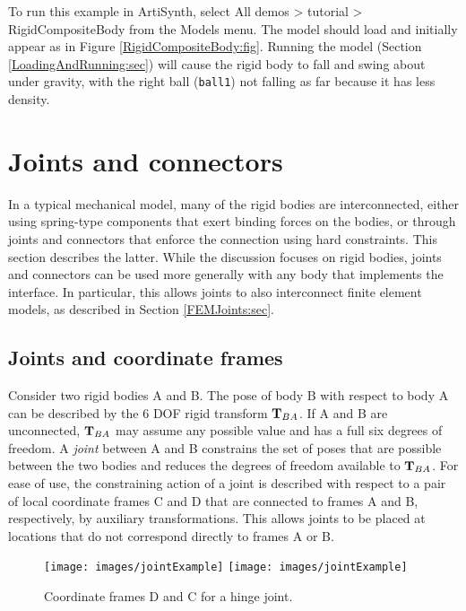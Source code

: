 To run this example in ArtiSynth, select {\sf All demos > tutorial >
RigidCompositeBody} from the {\sf Models} menu. The model should load
and initially appear as in Figure \ref{RigidCompositeBody:fig}.
Running the model (Section \ref{LoadingAndRunning:sec}) will cause the
rigid body to fall and swing about under gravity, with the right ball
({\tt ball1}) not falling as far because it has less density.

\section{Joints and connectors}
\label{JointsAndConnectors:sec}

In a typical mechanical model, many of the rigid bodies are
interconnected, either using spring-type components that exert binding
forces on the bodies, or through joints and connectors that enforce
the connection using hard constraints. This section describes the
latter. While the discussion focuses on rigid bodies, joints and
connectors can be used more generally with any body that implements
the 
interface. In particular, this allows joints to also interconnect
finite element models, as described in Section \ref{FEMJoints:sec}.

\subsection{Joints and coordinate frames}
\label{JointsAndFrames:sec}

Consider two rigid bodies A and B. The pose of body B with respect to
body A can be described by the 6 DOF rigid transform ${\bf T}_{BA}$.  If A
and B are unconnected, ${\bf T}_{BA}$ may assume any possible value and has
a full six degrees of freedom. A {\it joint} between A and B
constrains the set of poses that are possible between the two bodies
and reduces the degrees of freedom available to ${\bf T}_{BA}$.  For ease
of use, the constraining action of a joint is described with respect
to a pair of local coordinate frames C and D that are connected to
frames A and B, respectively, by auxiliary transformations.  This
allows joints to be placed at locations that do not correspond
directly to frames A or B.

\begin{figure}[ht]
\begin{center}
 \iflatexml
   \texttt{[image: images/jointExample]}
 \else
   \texttt{[image: images/jointExample]}
 \fi
\end{center}
\caption{Coordinate frames D and C for a hinge joint.}
\label{jointExample:fig}
\end{figure}

